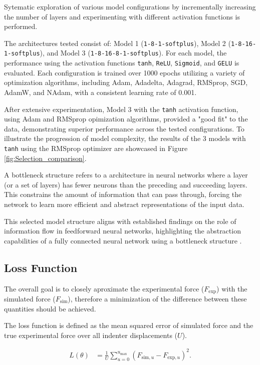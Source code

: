 Sytematic exploration of various model configurations by incrementally increasing the number of layers and experimenting with different activation functions is performed.

The architectures tested consist of: Model 1 (\texttt{1-8-1-softplus}),
Model 2 (\texttt{1-8-16-1-softplus}), 
and Model 3 (\texttt{1-8-16-8-1-softplus}).
For each model, the performance using the activation functions \texttt{tanh}, \texttt{ReLU}, \texttt{Sigmoid}, and \texttt{GELU} is evaluated. Each configuration is trained over 1000 epochs utilizing a variety of optimization algorithms, including Adam, Adadelta, Adagrad, RMSprop, SGD, AdamW, and NAdam, with a consistent learning rate of 0.001.

After extensive experimentation, Model 3 with the \texttt{tanh} activation function, using Adam and RMSprop opimization algorithms, provided a "good fit" to the data, demonstrating superior performance across the tested configurations. To illustrate the progression of model complexity, the results of the 3 models with \texttt{tanh} using the RMSprop optimizer are showcased in Figure \ref{fig:Selection_comparison}.

A bottleneck structure refers to a architecture in neural networks where a layer (or a set of layers) has fewer neurons than the preceding and succeeding layers. This constrains the amount of information that can pass through, forcing the network to learn more efficient and abstract representations of the input data.

This selected model structure aligns with established findings on the role of information flow in feedforward neural networks, highlighting the abstraction capabilities of a fully connected neural network using a bottleneck structure \citep{Khadivi2016}.



\newpage
\subsection{Loss Function}
The overall goal is to closely aproximate the experimental force ($F_{\text{exp}}$) with the simulated force ($F_\text{{sim}}$), therefore a minimization of the difference between these quantities should be achieved.

The loss function is defined as the mean squared error of simulated force and the true experimental force over all indenter displacements ($U$).

\begin{align*}
L(\theta) &= \frac{1}{U} \sum_{u=0}^{u_{\text{max}}} \left(F_{\text{sim},u} - F_{\text{exp},u}\right)^2
.
\end{align*}

